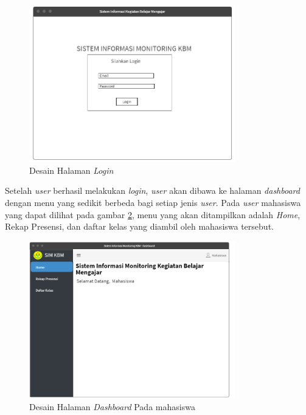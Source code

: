 \begin{figure}[h!]
	\centering
	\includegraphics[width=0.8\textwidth]{gambar/mockup/login}
	\caption{Desain Halaman \textit{Login}}
	\label{fig:login}
\end{figure}

Setelah \textit{user} berhasil melakukan \textit{login}, \textit{user} akan dibawa ke halaman \textit{dashboard} dengan menu yang sedikit berbeda bagi setiap jenis \textit{user}. Pada \textit{user} mahasiswa yang dapat dilihat pada gambar \ref{fig:dashboard}, menu yang akan ditampilkan adalah \textit{Home}, Rekap Presensi, dan daftar kelas yang diambil oleh mahasiswa tersebut.

\begin{figure}[h!]
	\centering
	\includegraphics[width=0.8\textwidth]{gambar/mockup/home_mahasiswa}
	\caption{Desain Halaman \textit{Dashboard} Pada mahasiswa}
	\label{fig:dashboard}
\end{figure}


